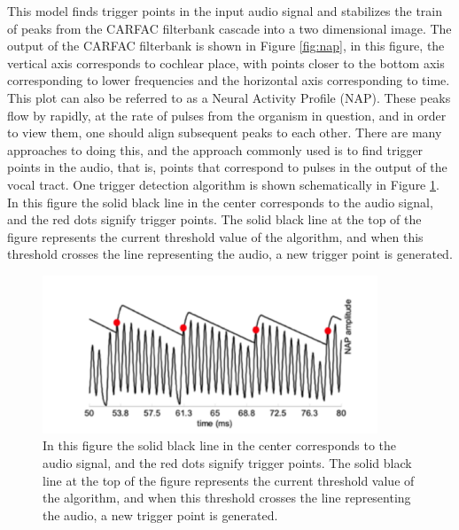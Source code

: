 \documentclass[12pt,oneside]{book}
\begin{document}
This model finds trigger points in the input audio signal and
stabilizes the train of peaks from the CARFAC filterbank cascade into
a two dimensional image.  The output of the CARFAC filterbank is shown
in Figure \ref{fig:nap}, in this figure, the vertical axis corresponds
to cochlear place, with points closer to the bottom axis corresponding
to lower frequencies and the horizontal axis corresponding to time.
This plot can also be referred to as a Neural Activity Profile (NAP).
These peaks flow by rapidly, at the rate of pulses from the organism
in question, and in order to view them, one should align subsequent
peaks to each other.  There are many approaches to doing this, and the
approach commonly used is to find trigger points in the audio, that
is, points that correspond to pulses in the output of the vocal tract.
One trigger detection algorithm is shown schematically in Figure
\ref{fig:triggerpoints}.  In this figure the solid black line in the
center corresponds to the audio signal, and the red dots signify
trigger points.  The solid black line at the top of the figure
represents the current threshold value of the algorithm, and when this
threshold crosses the line representing the audio, a new trigger point
is generated.

\begin{figure}[t]
\begin{center}
\includegraphics[width=100mm]{figures/triggerpoints}
\caption{ In this figure the solid black line in the center
  corresponds to the audio signal, and the red dots signify trigger
  points.  The solid black line at the top of the figure represents
  the current threshold value of the algorithm, and when this
  threshold crosses the line representing the audio, a new trigger
  point is generated.}
\label{fig:triggerpoints} 
\end{center} 
\end{figure} 
\end{document}
